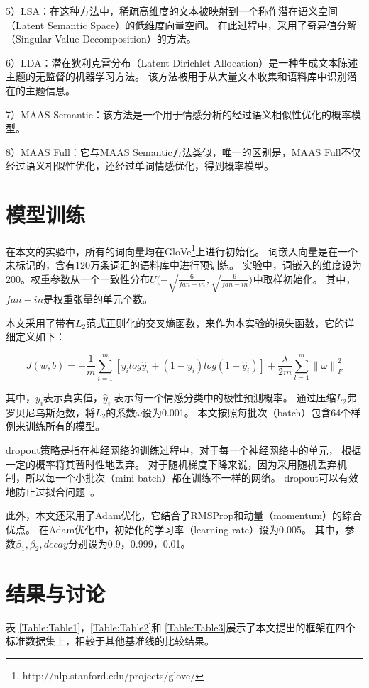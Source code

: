 5）LSA：在这种方法中，稀疏高维度的文本被映射到一个称作潜在语义空间（Latent Semantic Space）的低维度向量空间。
在此过程中，采用了奇异值分解（Singular Value Decomposition）的方法。

6）LDA：潜在狄利克雷分布（Latent Dirichlet Allocation）是一种生成文本陈述主题的无监督的机器学习方法。
该方法被用于从大量文本收集和语料库中识别潜在的主题信息。

7）MAAS Semantic：该方法是一个用于情感分析的经过语义相似性优化的概率模型。

8）MAAS Full：它与MAAS Semantic方法类似，唯一的区别是，MAAS Full不仅经过语义相似性优化，还经过单词情感优化，得到概率模型。

\section{模型训练}
在本文的实验中，所有的词向量均在GloVe\footnote{http://nlp.stanford.edu/projects/glove/}上进行初始化。
词嵌入向量是在一个未标记的，含有120万条词汇的语料库中进行预训练。
实验中，词嵌入的维度设为200。权重参数从一个一致性分布${U(-\sqrt{\frac{6}{fan-in}},\sqrt{\frac{6}{fan-in})}}$中取样初始化。
其中，${fan-in}$是权重张量的单元个数。

本文采用了带有${L_{2}}$范式正则化的交叉熵函数，来作为本实验的损失函数，它的详细定义如下：

\begin{equation}
    J\left(w,b\right)=-\frac{1}{m}\sum_{i=1}^{m}\left[y_{i}log\hat{y}_{i}+\left(1-y_{i} \right)log\left ( 1-\widehat{y}_{i} \right )\right] + \frac{\lambda }{2m}\sum_{l=1}^{m}\left\|\omega \right\|_{F}^{2}
\end{equation}

其中，${y_{i}}$表示真实值，${\hat{y}_{i}}$ 表示每一个情感分类中的极性预测概率。
通过压缩${L_{2}}$弗罗贝尼乌斯范数，将${L_{2}}$的系数${\omega}$设为0.001。
本文按照每批次（batch）包含64个样例来训练所有的模型。

dropout策略是指在神经网络的训练过程中，对于每一个神经网络中的单元，
根据一定的概率将其暂时性地丢弃。
对于随机梯度下降来说，因为采用随机丢弃机制，所以每一个小批次（mini-batch）都在训练不一样的网络。
dropout可以有效地防止过拟合问题~。

此外，本文还采用了Adam优化，它结合了RMSProp和动量（momentum）的综合优点。
在Adam优化中，初始化的学习率（learning rate）设为0.005。
其中，参数${\beta_{1}, \beta_{2}, decay}$分别设为0.9，0.999，0.01。

\section{结果与讨论}
表 \ref{Table:Table1}，\ref{Table:Table2}和 \ref{Table:Table3}展示了本文提出的框架在四个标准数据集上，相较于其他基准线的比较结果。

